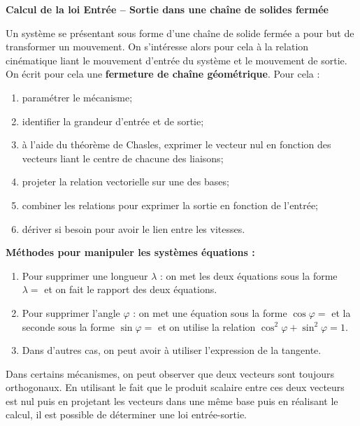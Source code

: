 \documentclass[10pt,fleqn]{article} %
\begin{document}
\begin{methode}
\textbf{Calcul de la loi Entrée -- Sortie dans une chaîne de solides fermée}

Un système se présentant sous forme d'une chaîne de solide fermée a pour but de transformer un mouvement. On s'intéresse alors pour cela à la relation cinématique liant le mouvement d'entrée du système et le mouvement de sortie. On écrit pour cela une \textbf{fermeture de chaîne géométrique}. Pour cela :
\begin{enumerate}
\item paramétrer le mécanisme;
\item identifier la grandeur d'entrée et de sortie;
\item à l'aide du théorème de Chasles, exprimer le vecteur nul en fonction des vecteurs liant le centre de chacune des liaisons;
\item projeter la relation vectorielle sur une des bases;
\item combiner les relations pour exprimer la sortie en fonction de l'entrée;
\item dériver si besoin pour avoir le lien entre les vitesses. 
\end{enumerate}
\end{methode}


\begin{methode}
\textbf{Méthodes pour manipuler les systèmes équations :} 
\begin{enumerate}
\item Pour supprimer une longueur $\lambda$ : on met les deux équations sous la forme $\lambda =$ et on fait le rapport des deux équations.
\item Pour supprimer l'angle $\varphi$ : on met une équation sous la forme $\cos\varphi = $ et la seconde sous la forme $\sin\varphi = $ et on utilise la relation $\cos^2\varphi +\sin^2\varphi =1 $.
\item Dans d'autres cas, on peut avoir à utiliser l'expression de la tangente.
\end{enumerate}
\end{methode}


\begin{methode}
Dans certains mécanismes, on peut observer que deux vecteurs sont toujours orthogonaux. En utilisant le fait que le produit scalaire entre ces deux vecteurs est nul puis en projetant les vecteurs dans une même base puis en réalisant le calcul, il est possible de déterminer une loi entrée-sortie.
\end{methode}
\end{document}
